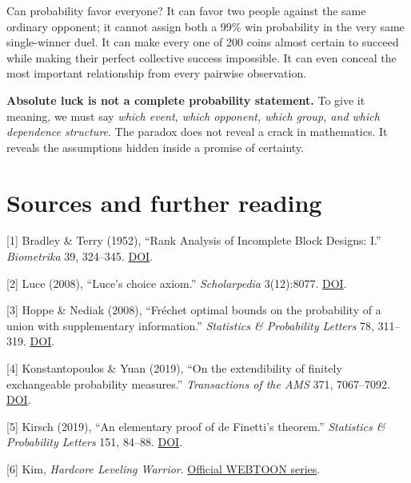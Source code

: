 \documentclass[
  11pt,
]{article}
\begin{document}
Can probability favor everyone? It can favor two people against the same
ordinary opponent; it cannot assign both a 99\% win probability in the
very same single-winner duel. It can make every one of 200 coins almost
certain to succeed while making their perfect collective success
impossible. It can even conceal the most important relationship from
every pairwise observation.

\textbf{Absolute luck is not a complete probability statement.} To give
it meaning, we must say \emph{which event, which opponent, which group,
and which dependence structure}. The paradox does not reveal a crack in
mathematics. It reveals the assumptions hidden inside a promise of
certainty.

\begingroup\footnotesize\setlength{\parskip}{3pt}

\section{Sources and further reading}\label{sources-and-further-reading}

{[}1{]} Bradley \& Terry (1952), ``Rank Analysis of Incomplete Block
Designs: I.'' \emph{Biometrika} 39, 324--345.
\href{https://doi.org/10.1093/biomet/39.3-4.324}{DOI}.

{[}2{]} Luce (2008), ``Luce's choice axiom.'' \emph{Scholarpedia}
3(12):8077. \href{https://doi.org/10.4249/scholarpedia.8077}{DOI}.

{[}3{]} Hoppe \& Nediak (2008), ``Fréchet optimal bounds on the
probability of a union with supplementary information.''
\emph{Statistics \& Probability Letters} 78, 311--319.
\href{https://doi.org/10.1016/j.spl.2007.02.019}{DOI}.

{[}4{]} Konstantopoulos \& Yuan (2019), ``On the extendibility of
finitely exchangeable probability measures.'' \emph{Transactions of the
AMS} 371, 7067--7092. \href{https://doi.org/10.1090/tran/7701}{DOI}.

{[}5{]} Kirsch (2019), ``An elementary proof of de Finetti's theorem.''
\emph{Statistics \& Probability Letters} 151, 84--88.
\href{https://doi.org/10.1016/j.spl.2019.03.014}{DOI}.

{[}6{]} Kim, \emph{Hardcore Leveling Warrior}.
\href{https://www.webtoons.com/en/action/hardcore-leveling-warrior/list?title_no=1221}{Official
WEBTOON series}.

\endgroup
\end{document}
